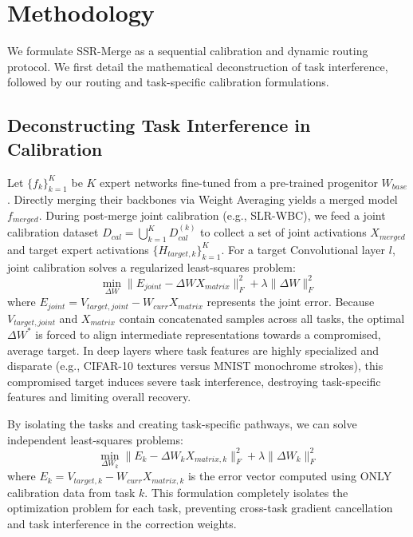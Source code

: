 \documentclass{article}
\theoremstyle{plain}
\theoremstyle{definition}
\theoremstyle{remark}
\begin{document}
\section{Methodology}
\label{submission:method}

We formulate SSR-Merge as a sequential calibration and dynamic routing protocol. We first detail the mathematical deconstruction of task interference, followed by our routing and task-specific calibration formulations.

\subsection{Deconstructing Task Interference in Calibration}
Let $\{f_k\}_{k=1}^K$ be $K$ expert networks fine-tuned from a pre-trained progenitor $W_{base}$. Directly merging their backbones via Weight Averaging yields a merged model $f_{merged}$. 
During post-merge joint calibration (e.g., SLR-WBC), we feed a joint calibration dataset $D_{cal} = \bigcup_{k=1}^K D_{cal}^{(k)}$ to collect a set of joint activations $X_{merged}$ and target expert activations $\{H_{target,k}\}_{k=1}^K$. For a target Convolutional layer $l$, joint calibration solves a regularized least-squares problem:
\begin{equation}
\min_{\Delta W} \| E_{joint} - \Delta W X_{matrix} \|_F^2 + \lambda \| \Delta W \|_F^2
\end{equation}
where $E_{joint} = V_{target, joint} - W_{curr} X_{matrix}$ represents the joint error. 
Because $V_{target, joint}$ and $X_{matrix}$ contain concatenated samples across all tasks, the optimal $\Delta W^*$ is forced to align intermediate representations towards a compromised, average target. In deep layers where task features are highly specialized and disparate (e.g., CIFAR-10 textures versus MNIST monochrome strokes), this compromised target induces severe task interference, destroying task-specific features and limiting overall recovery.

By isolating the tasks and creating task-specific pathways, we can solve independent least-squares problems:
\begin{equation}
\min_{\Delta W_k} \| E_{k} - \Delta W_k X_{matrix,k} \|_F^2 + \lambda \| \Delta W_k \|_F^2
\end{equation}
where $E_k = V_{target,k} - W_{curr} X_{matrix,k}$ is the error vector computed using ONLY calibration data from task $k$. This formulation completely isolates the optimization problem for each task, preventing cross-task gradient cancellation and task interference in the correction weights.
\end{document}
